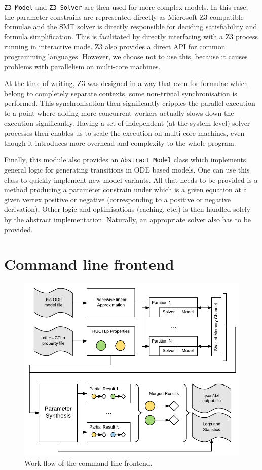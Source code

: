 \texttt{Z3 Model} and \texttt{Z3 Solver} are then used for more complex models. In this case, the parameter constrains are represented directly as Microsoft Z3 compatible formulae and the SMT solver is directly responsible for deciding satisfiability and formula simplification. This is facilitated by directly interfacing with a Z3 process running in interactive mode. Z3 also provides a direct API for common programming languages. However, we choose not to use this, because it causes problems with parallelism on multi-core machines. 

At the time of writing, Z3 was designed in a way that even for formulae which belong to completely separate contexts, some non-trivial synchronisation is performed. This synchronisation then significantly cripples the parallel execution to a point where adding more concurrent workers actually slows down the execution significantly. Having a set of independent (at the system level) solver processes then enables us to scale the execution on multi-core machines, even though it introduces more overhead and complexity to the whole program.

Finally, this module also provides an \texttt{Abstract Model} class which implements general logic for generating transitions in ODE based models. One can use this class to quickly implement new model variants. All that needs to be provided is a method producing a parameter constrain under which is a given equation at a given vertex positive or negative (corresponding to a positive or negative derivation). Other logic and optimisations (caching, etc.) is then handled solely by the abstract implementation. Naturally, an appropriate solver also has to be provided.

\section{Command line frontend}

\begin{figure}[]
	\centering
	\includegraphics[scale=0.9]{media/cli_workflow.pdf}
	\caption{Work flow of the command line frontend. }
	\label{fig:cli_workflow}
\end{figure}

